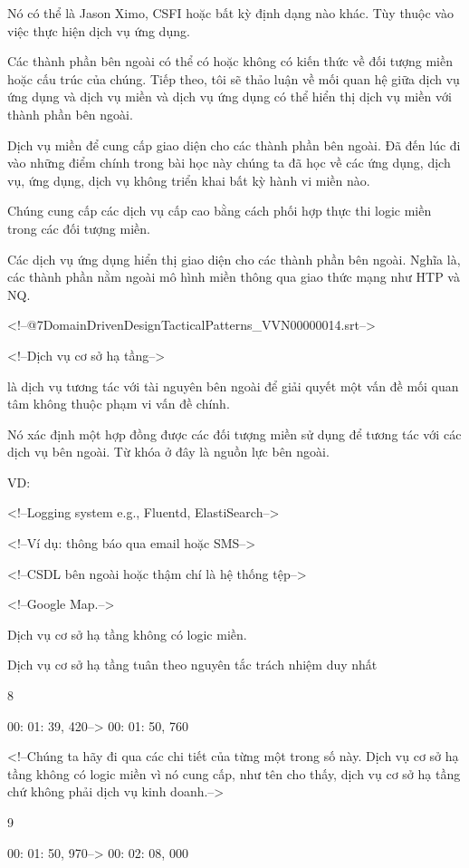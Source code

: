 Nó có thể là Jason Ximo, CSFI hoặc bất kỳ định dạng nào khác. Tùy thuộc vào việc thực hiện dịch vụ ứng dụng.

Các thành phần bên ngoài có thể có hoặc không có kiến ​​thức về đối tượng miền hoặc cấu trúc của chúng. Tiếp theo, tôi sẽ thảo luận về mối quan hệ giữa dịch vụ ứng dụng và dịch vụ miền và dịch vụ ứng dụng có thể hiển thị dịch vụ miền với thành phần bên ngoài.

Dịch vụ miền để cung cấp giao diện cho các thành phần bên ngoài. Đã đến lúc đi vào những điểm chính trong bài học này chúng ta đã học về các ứng dụng, dịch vụ, ứng dụng, dịch vụ không triển khai bất kỳ hành vi miền nào.

Chúng cung cấp các dịch vụ cấp cao bằng cách phối hợp thực thi logic miền trong các đối tượng miền.

Các dịch vụ ứng dụng hiển thị giao diện cho các thành phần bên ngoài. Nghĩa là, các thành phần nằm ngoài mô hình miền thông qua giao thức mạng như HTP và NQ.

<!--@\07DomainDrivenDesignTacticalPatterns_VVN\000000014.srt-->

<!--Dịch vụ cơ sở hạ tầng-->

là dịch vụ tương tác với tài nguyên bên ngoài để giải quyết một vấn đề mối quan tâm không thuộc phạm vi vấn đề chính.

Nó xác định một hợp đồng được các đối tượng miền sử dụng để tương tác với các dịch vụ bên ngoài. Từ khóa ở đây là nguồn lực bên ngoài.

VD:

<!--Logging system e.g., Fluentd, ElastiSearch-->

<!--Ví dụ: thông báo qua email hoặc SMS-->

<!--CSDL bên ngoài hoặc thậm chí là hệ thống tệp-->

<!--Google Map.-->

Dịch vụ cơ sở hạ tầng không có logic miền.

Dịch vụ cơ sở hạ tầng tuân theo nguyên tắc trách nhiệm duy nhất

8

00: 01: 39, 420--> 00: 01: 50, 760

<!--Chúng ta hãy đi qua các chi tiết của từng một trong số này. Dịch vụ cơ sở hạ tầng không có logic miền vì nó cung cấp, như tên cho thấy, dịch vụ cơ sở hạ tầng chứ không phải dịch vụ kinh doanh.-->

9

00: 01: 50, 970--> 00: 02: 08, 000

